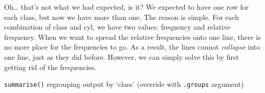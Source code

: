 \documentclass[]{tufte-book}
\newenvironment{Shaded}{}{}
\newcommand{\DataTypeTok}[1]{\textcolor[rgb]{0.56,0.13,0.00}{#1}}
\newcommand{\DecValTok}[1]{\textcolor[rgb]{0.25,0.63,0.44}{#1}}
\newcommand{\KeywordTok}[1]{\textcolor[rgb]{0.00,0.44,0.13}{\textbf{#1}}}
\newcommand{\NormalTok}[1]{#1}
\newcommand{\OperatorTok}[1]{\textcolor[rgb]{0.40,0.40,0.40}{#1}}
\newcommand{\StringTok}[1]{\textcolor[rgb]{0.25,0.44,0.63}{#1}}
\begin{document}
Oh\ldots{} that's not what we had expected, is it? We expected to have one row for each class, but now we have more than one. The reason is simple. For each combination of class and cyl, we have two values: frequency and relative frequency. When we want to spread the relative frequencies onto one line, there is no more place for the frequencies to go. As a result, the lines cannot \emph{collapse} into one line, just as they did before. However, we can simply solve this by first getting rid of the frequencies.

\begin{Shaded}
\end{Shaded}

\texttt{summarise()} regrouping output by `class' (override with \texttt{.groups} argument)
\end{document}
